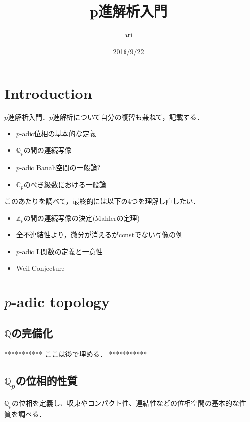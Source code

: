 \documentclass{ujarticle}
\title{p進解析入門}
\author{ari}
\date{2016/9/22}
\begin{document}
\maketitle
\tableofcontents


\section{Introduction}
\label{sec:Introduction}

$p$進解析入門．$p$進解析について自分の復習も兼ねて，記載する．

\begin{itemize}
  \item $p$-adic位相の基本的な定義
  \item $\mathbb{Q}_p$の間の連続写像
  \item $p$-adic Banah空間の一般論?
  \item $\mathbb{C}_p$のべき級数における一般論
\end{itemize}

このあたりを調べて，最終的には以下の4つを理解し直したい．
\begin{itemize}
  \item $\mathbb{Z}_p$の間の連続写像の決定(Mahlerの定理)
  \item 全不連結性より，微分が消えるがconstでない写像の例
  \item $p$-adic L関数の定義と一意性
  \item Weil Conjecture
\end{itemize}

\section{$p$-adic topology}
\label{sec:$p$-adic topology}

\subsection{$\mathbb{Q}$の完備化}
\label{sub:\mathbb{Q}の完備化}

***********
ここは後で埋める．
***********

\subsection{$\mathbb{Q}_p$の位相的性質}
\label{sub:$qb}


$\mathbb{Q}_p$の位相を定義し、収束やコンパクト性、連結性などの位相空間の基本的な性質を調べる．
\end{document}
